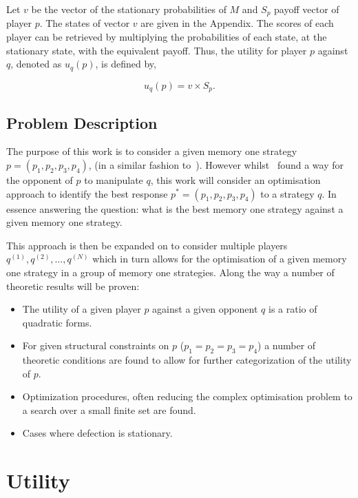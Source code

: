 \documentclass[10pt]{article}
\begin{document}
Let \(v\) be the vector of the stationary probabilities of \(M\) and \(S_p\)
payoff vector of player \(p\). The states of vector \(v\) are given in the
Appendix. The scores of each player can be
retrieved by multiplying the probabilities of each state, at the stationary state,
with the equivalent payoff. Thus, the  utility for player \(p\) against \(q\),
denoted as \(u_q(p)\), is defined by,

\begin{equation}\label{eq:press_dyson_utility}
    u_q(p) = v \times S_p.
\end{equation}

\subsection{Problem Description}

The purpose of this work is to consider a given memory one strategy 
\(p=(p_1, p_2, p_3, p_4)\), (in a similar fashion to~\cite{Press2012}). However
whilst~\cite{Press2012} found a way for the opponent of \(p\) to manipulate 
\(q\), this work will consider an optimisation approach to identify the best 
response \(p^*=(p_1, p_2, p_3, p_4)\) to a strategy \(q\). In essence 
answering the question: what is the best memory one strategy against a given 
memory one strategy.

This approach is then be expanded on to consider multiple players \(q^{(1)},
q^{(2)}, \dots ,q^{(N)}\) which in turn allows for the optimisation  of a given memory
one strategy in a group of memory one strategies. Along the way a number of
theoretic results will be proven:

\begin{itemize}
    \item The utility of a given player \(p\) against a given opponent \(q\) 
    is a ratio of quadratic forms.
    \item For given structural constraints on \(p\) (\(p_1=p_2=p_3=p_4\)) a number
    of theoretic conditions are found to allow for further categorization of the
    utility of \(p\).
    \item Optimization procedures, often reducing the complex optimisation 
    problem to a search over a small finite set are found.
    \item Cases where defection is stationary.
\end{itemize}

\section{Utility}
\end{document}

